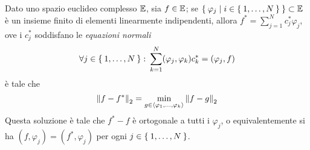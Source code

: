 	\begin{teorema}\label{th:proiez-ortog}
		Dato uno spazio euclideo complesso \(\mathbb{E}\), sia \(f \in \mathbb{E}\); se \(\Set{\varphi_j | i \in \Set{1, \dots, N}} \subset \mathbb{E}\) è un insieme finito di elementi linearmente indipendenti, allora \(f^* = \sum_{j = 1}^N c_j^* \varphi_j\), ove i \(c_j^* \!\) soddisfano le \emph{equazioni normali}
		\begin{equation}\label{eq:eq-normali}
			\forall j \in \Set{1, \dots, N} \colon \sum_{k = 1}^N (\varphi_j, \varphi_k) c_k^* = (\varphi_j, f)
		\end{equation}
		è tale che\label{eq:proiez-ortog}
		\begin{equation}
			\norm{f - f^*}_2 = \min_{g \in \Braket{\varphi_1, \dots, \varphi_k}} \norm{f - g}_2
		\end{equation}
		Questa soluzione è tale che \(f^* - f\) è ortogonale a tutti i \(\varphi_j\), o equivalentemente si ha \((f, \varphi_j) = (f^*, \varphi_j)\) per ogni \(j \in \Set{1, \dots, N}\).
	\end{teorema}

